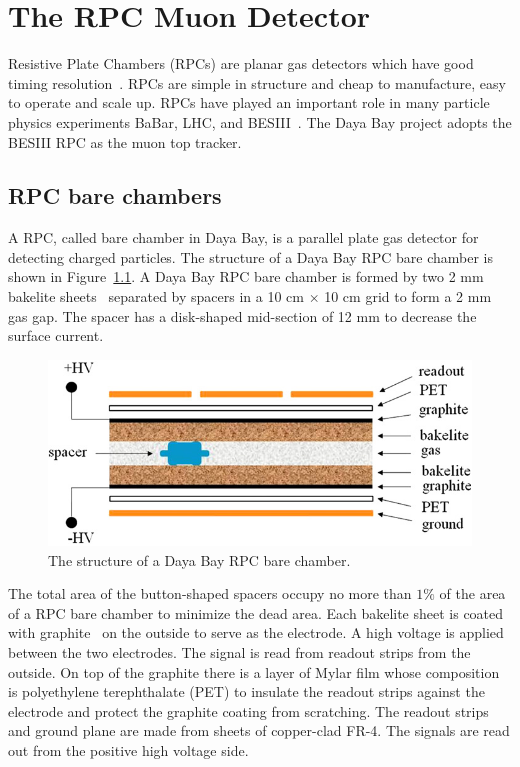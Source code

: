 \chapter{The RPC Muon Detector}\label{chap:RPC}

Resistive Plate Chambers (RPCs) are planar gas detectors which have good timing resolution~\cite{Santonico1981}. RPCs are simple in structure and cheap to manufacture, easy to operate and scale up. RPCs have played an important role in many particle physics experiments BaBar, LHC, and BESIII~\cite{Han2008}. The Daya Bay project adopts the BESIII RPC as the muon top tracker.


\section{RPC bare chambers}
A RPC, called bare chamber in Daya Bay, is a parallel plate gas detector for detecting charged particles. The structure of a Daya Bay RPC bare chamber is shown in Figure~\ref{fig:rpcstruct}. A Daya Bay RPC bare chamber is formed by two 2 mm bakelite sheets~\cite{Zhang2007} separated by spacers in a 10 cm $\times$ 10 cm grid to form a 2 mm gas gap. The spacer has a disk-shaped mid-section of 12 mm to decrease the surface current.
\begin{figure}
	\centering
	\includegraphics[width=.6\textwidth]{figures/chap5/RPC_Structure.eps}
	\caption{The structure of a Daya Bay RPC bare chamber.}
	\label{fig:rpcstruct}
\end{figure}
The total area of the button-shaped spacers occupy no more than $1\%$ of the area of a RPC bare chamber to minimize the dead area. Each bakelite sheet is coated with graphite~\cite{Ma2010} on the outside to serve as the electrode. A high voltage is applied between the two electrodes. The signal is read from readout strips from the outside. On top of the graphite there is a layer of Mylar film whose composition is polyethylene terephthalate (PET) to insulate the readout strips against the electrode and protect the graphite coating from scratching. The readout strips and ground plane are made from sheets of copper-clad FR-4. The signals are read out from the positive high voltage side.


